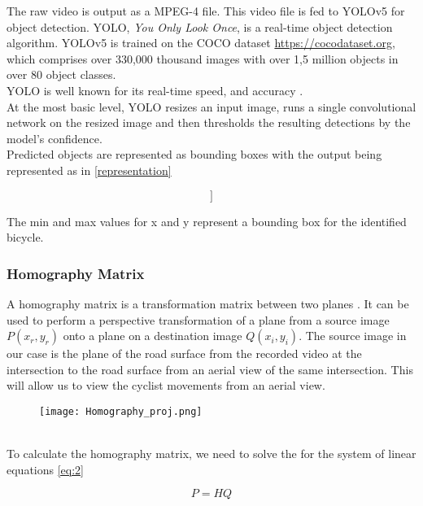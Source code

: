 The raw video is output as a MPEG-4 file. This video file is fed to YOLOv5 for object detection. YOLO, \textit{You Only Look Once},
is a real-time object detection algorithm. YOLOv5 is trained on the COCO dataset \url{https://cocodataset.org}, which comprises over 330,000 thousand images
with over 1,5 million objects in over 80 object classes.
\ \\ 
YOLO is well known for its real-time speed, and accuracy \cite{redmon2016look}.
\ \\ 
At the most basic level, YOLO resizes an input image, runs a single convolutional network on the resized image
and then thresholds the resulting detections by the model’s confidence.
\ \\ 
Predicted objects are represented as bounding boxes with the output being represented as in \ref{representation} 

\begin{equation}
  [ [frame id][xmin][ymin][xmax][ymax][confidence]]\label{representation}
\end{equation}

The min and max values for x and y represent a bounding box for the identified bicycle.

\subsubsection{Homography Matrix}

A homography matrix is a transformation matrix between two planes \cite{hartley_zisserman_2004}. It can be used to perform a perspective transformation of a plane from a source image $P(x_r, y_r)$ onto a plane on a destination image $Q(x_i, y_i)$.
The source image in our case is the plane of the road surface from the recorded video at the intersection to the road surface from an aerial view of the same intersection.  
This will allow us to view the cyclist movements from an aerial view.
\ \\ 
\begin{figure}[h]
  \texttt{[image: Homography\_proj.png]}
  \centering 
  \end{figure}
  \label{homography}
\ \\ 
To calculate the homography matrix, we need to solve the for the system of linear equations \ref{eq:2}

\begin{equation}
  P = HQ\label{eq:2}
\end{equation} 

